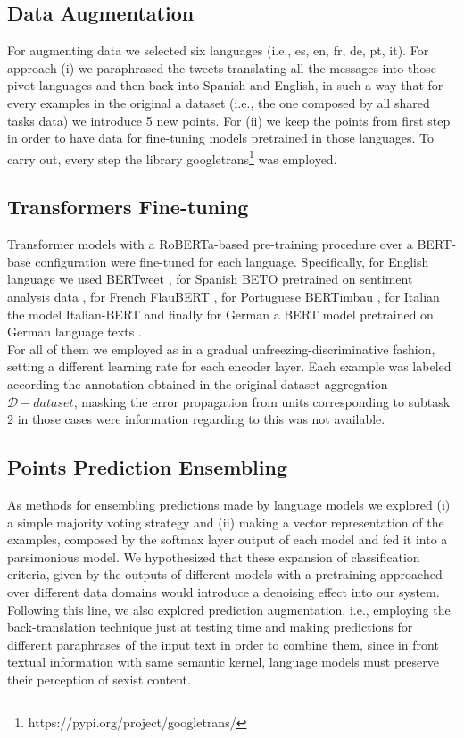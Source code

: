 \documentclass[
]{ceurart}
\begin{document}
	\subsection{Data Augmentation}
	
	For augmenting data we selected six languages (i.e., es, en, fr, de, pt, it). For approach (i) we paraphrased the tweets translating all the messages into those pivot-languages and then back into Spanish and English, in such a way that for every examples in the original a dataset (i.e., the one composed by all shared tasks data) we introduce 5 new points.
	For (ii) we keep the points from  first step in order to have data for fine-tuning models pretrained in those languages. To carry out, every step the library googletrans\footnote{https://pypi.org/project/googletrans/} was employed.
	
	\subsection{Transformers Fine-tuning}
	
	Transformer models with a RoBERTa-based \cite{liu2019roberta} pre-training procedure over a BERT-base \cite{DBLP:journals/corr/abs-1810-04805} configuration were fine-tuned for each language. Specifically, for English language we used BERTweet \cite{bertweet}, for Spanish BETO pretrained on sentiment analysis data \cite{perez2021pysentimiento}, for French FlauBERT \cite{le2020flaubert}, for Portuguese BERTimbau \cite{souza2020bertimbau}, for Italian the model Italian-BERT \cite{stefan_schweter_2020_4263142} and finally for German a BERT model pretrained on German language texts \cite{guhr-EtAl:2020:LREC}.
	\\
	For all of them we employed as in \cite{tamayo:2021} a gradual unfreezing-discriminative fashion, setting a different learning rate for each encoder layer. Each example  was labeled according the annotation obtained in the original dataset aggregation $\mathcal{D}-dataset$, masking the error propagation from units corresponding to subtask 2 in those cases were information regarding to this was not available. 
	
	\subsection{Points Prediction Ensembling}
	
	As methods for ensembling predictions made by language models we explored (i) a simple majority voting strategy and (ii) making a vector representation of the examples, composed by the softmax layer output of each model and fed it into a parsimonious model. We hypothesized that these expansion of classification criteria, given by the outputs of different models with a pretraining approached over different data domains would introduce a denoising effect into our system.\\
	Following this line, we also explored prediction augmentation, i.e., employing the back-translation technique just at testing time and making predictions for different paraphrases of the input text in order to combine them, since in front textual information with same semantic kernel, language models must preserve their perception of sexist content.
	
\end{document}
